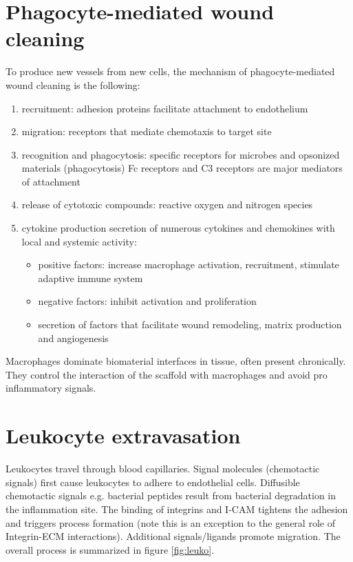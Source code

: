 \section{Phagocyte-mediated wound cleaning}
To produce new vessels from new cells, the mechanism of phagocyte-mediated wound cleaning is the following:
\begin{enumerate}
\item recruitment: adhesion proteins facilitate attachment to endothelium
\item migration: receptors that mediate chemotaxis to target site
\item recognition and phagocytosis: specific receptors for microbes and opsonized materials (phagocytosis) Fc receptors and C3 receptors are major mediators of attachment
\item release of cytotoxic compounds: reactive oxygen and nitrogen species
\item cytokine production secretion of numerous cytokines and chemokines with local and systemic activity:
	 \begin{itemize}
		\item positive factors: increase macrophage activation, recruitment, stimulate adaptive immune system
		\item negative factors: inhibit activation and proliferation
		\item secretion of factors that facilitate wound remodeling, matrix production and angiogenesis
	\end{itemize}
\end{enumerate}
\noindent	
Macrophages dominate biomaterial interfaces in tissue, often present chronically. 
They control the interaction of the scaffold with macrophages and avoid pro inflammatory signals.

\section{Leukocyte extravasation}
Leukocytes travel through blood capillaries. 
Signal molecules (chemotactic signals) first cause leukocytes to adhere to endothelial cells. 
Diffusible chemotactic signals e.g. bacterial peptides result from bacterial degradation in the inflammation site.
The binding of integrins and I-CAM tightens the adhesion and triggers process formation (note this is an exception to the general role of Integrin-ECM interactions).
Additional signals/ligands promote migration.
The overall process is summarized in figure \ref{fig:leuko}.

